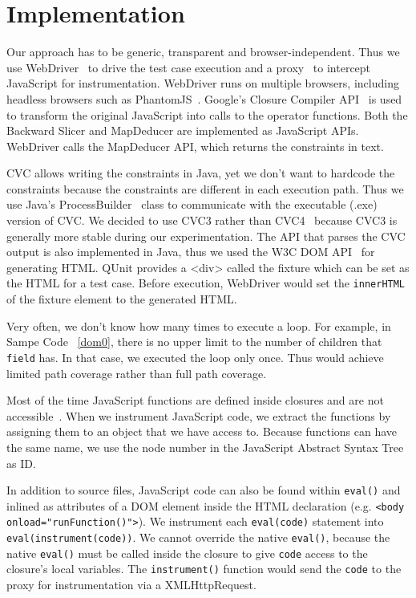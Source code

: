 \section{Implementation}

Our approach has to be generic, transparent and browser-independent.  Thus we use WebDriver~\cite{webdriver} to drive the test case execution and a proxy~\cite{webscarab} to intercept JavaScript for instrumentation.  
WebDriver runs on multiple browsers, including headless browsers such as PhantomJS~\cite{phantomjs}.  
Google's Closure Compiler API~\cite{ClosureCompiler} is used to transform the original JavaScript into calls to the operator functions. 
Both the Backward Slicer and MapDeducer are implemented as JavaScript APIs.  WebDriver calls the MapDeducer API, which returns the constraints in text.  

CVC allows writing the constraints in Java, yet we don't want to hardcode the constraints because the constraints are different in each execution path.  
Thus we use Java's ProcessBuilder~\cite{processbuilder} class to communicate with the executable (.exe) version of CVC.  We decided to use CVC3 rather than CVC4~\cite{cvc4} because CVC3 is generally more stable during our experimentation.  
The API that parses the CVC output is also implemented in Java, thus we used the W3C DOM API~\cite{DomAPI} for generating HTML.  
QUnit provides a <div> called the fixture which can be set as the HTML for a test case.   Before execution, WebDriver would set the {\tt innerHTML} of the fixture element to the generated HTML.  

Very often, we don't know how many times to execute a loop.  For example, in Sampe Code ~\ref{dom0}, there is no upper limit to the number of children that {\tt field} has.  
In that case, we executed the loop only once.  Thus \tool would achieve limited path coverage rather than full path coverage.  

Most of the time JavaScript functions are defined inside closures and are not accessible~\cite{privatefunctions}.  
When we instrument JavaScript code, we extract the functions by assigning them to an object that we have access to.  Because functions can have the same name, we use the node number in the JavaScript Abstract Syntax Tree as ID.

In addition to source files, JavaScript code can also be found within {\tt eval()} and inlined as attributes of a DOM element inside the HTML declaration (e.g. {\tt <body onload="runFunction()">}).
We instrument each {\tt eval(code)} statement into {\tt eval(instrument(code))}.  We cannot override the native {\tt eval()}, because the native {\tt eval()} must be called inside the closure to give {\tt code} access to the closure's local variables.  
The {\tt instrument()} function would send the {\tt code} to the proxy for instrumentation via a XMLHttpRequest.  

